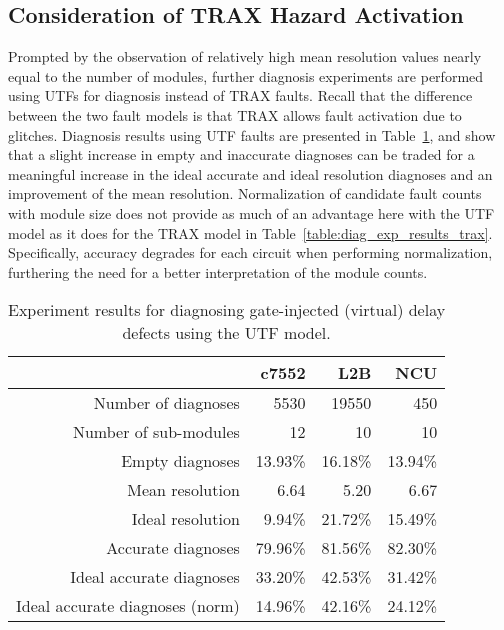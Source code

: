 \subsection{Consideration of TRAX Hazard Activation}
\label{sec:diag_exp_traxnh}

Prompted by the observation of relatively high mean resolution values nearly equal to the number of modules, further diagnosis experiments are performed using UTFs for diagnosis instead of TRAX faults.
%
Recall that the difference between the two fault models is that TRAX allows fault activation due to glitches.
%
Diagnosis results using UTF faults are presented in Table~\ref{table:diag_exp_results_traxnh}, and show that a slight increase in empty and inaccurate diagnoses can be traded for a meaningful increase in the ideal accurate and ideal resolution diagnoses and an improvement of the mean resolution.
%
Normalization of candidate fault counts with module size does not provide as much of an advantage here with the UTF model as it does for the TRAX model in Table~\ref{table:diag_exp_results_trax}.
%
Specifically, accuracy degrades for each circuit when performing normalization, furthering the need for a better interpretation of the module counts.

\begin{table}[hbtp]
\center
\begin{tabular*}{0.8\columnwidth}{@{\extracolsep{\fill}}rrrr}
\toprule
                                &c7552      &L2B        &NCU\\
\midrule
Number of diagnoses             &5530       &19550      &450\\
Number of sub-modules           &12         &10         &10\\
Empty diagnoses                 &13.93\%    &16.18\%    &13.94\%\\
Mean resolution                 &6.64       &5.20       &6.67\\
Ideal resolution                &9.94\%     &21.72\%    &15.49\%\\
Accurate diagnoses              &79.96\%    &81.56\%    &82.30\%\\
Ideal accurate diagnoses        &33.20\%    &42.53\%    &31.42\%\\
\midrule
Ideal accurate diagnoses (norm) &14.96\%    &42.16\%    &24.12\%\\
\bottomrule
\end{tabular*}
\caption{Experiment results for diagnosing gate-injected (virtual) delay defects using the UTF model.}
\label{table:diag_exp_results_traxnh}
\end{table}


